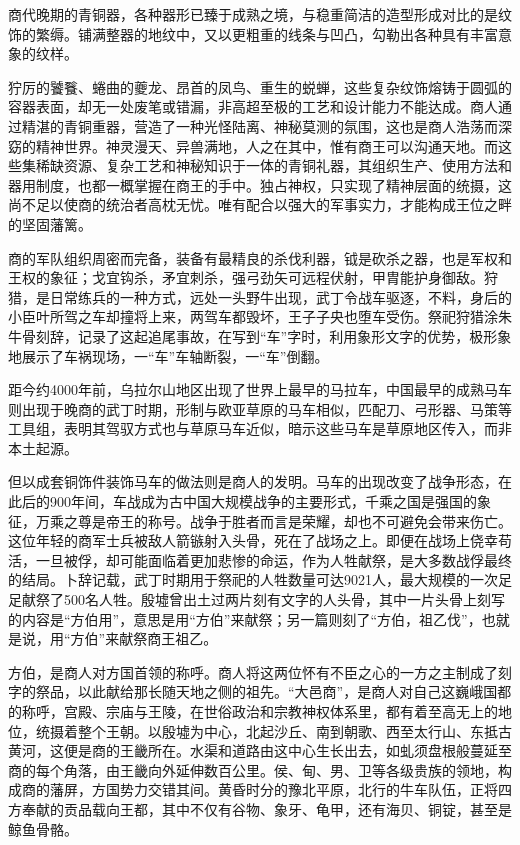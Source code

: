 商代晚期的青铜器，各种器形已臻于成熟之境，与稳重简洁的造型形成对比的是纹饰的繁缛。铺满整器的地纹中，又以更粗重的线条与凹凸，勾勒出各种具有丰富意象的纹样。

狞厉的饕餮、蜷曲的夔龙、昂首的凤鸟、重生的蜕蝉，这些复杂纹饰熔铸于圆弧的容器表面，却无一处废笔或错漏，非高超至极的工艺和设计能力不能达成。商人通过精湛的青铜重器，营造了一种光怪陆离、神秘莫测的氛围，这也是商人浩荡而深窈的精神世界。神灵漫天、异兽满地，人之在其中，惟有商王可以沟通天地。而这些集稀缺资源、复杂工艺和神秘知识于一体的青铜礼器，其组织生产、使用方法和器用制度，也都一概掌握在商王的手中。独占神权，只实现了精神层面的统摄，这尚不足以使商的统治者高枕无忧。唯有配合以强大的军事实力，才能构成王位之畔的坚固藩篱。

商的军队组织周密而完备，装备有最精良的杀伐利器，钺是砍杀之器，也是军权和王权的象征；戈宜钩杀，矛宜刺杀，强弓劲矢可远程伏射，甲胄能护身御敌。狩猎，是日常练兵的一种方式，远处一头野牛出现，武丁令战车驱逐，不料，身后的小臣叶所驾之车却撞将上来，两驾车都毁坏，王子子央也堕车受伤。祭祀狩猎涂朱牛骨刻辞，记录了这起追尾事故，在写到“车”字时，利用象形文字的优势，极形象地展示了车祸现场，一“车”车轴断裂，一“车”倒翻。

距今约4000年前，乌拉尔山地区出现了世界上最早的马拉车，中国最早的成熟马车则出现于晚商的武丁时期，形制与欧亚草原的马车相似，匹配刀、弓形器、马策等工具组，表明其驾驭方式也与草原马车近似，暗示这些马车是草原地区传入，而非本土起源。

但以成套铜饰件装饰马车的做法则是商人的发明。马车的出现改变了战争形态，在此后的900年间，车战成为古中国大规模战争的主要形式，千乘之国是强国的象征，万乘之尊是帝王的称号。战争于胜者而言是荣耀，却也不可避免会带来伤亡。这位年轻的商军士兵被敌人箭镞射入头骨，死在了战场之上。即便在战场上侥幸苟活，一旦被俘，却可能面临着更加悲惨的命运，作为人牲献祭，是大多数战俘最终的结局。卜辞记载，武丁时期用于祭祀的人牲数量可达9021人，最大规模的一次足足献祭了500名人牲。殷墟曾出土过两片刻有文字的人头骨，其中一片头骨上刻写的内容是“方伯用”，意思是用“方伯”来献祭；另一篇则刻了“方伯，祖乙伐”，也就是说，用“方伯”来献祭商王祖乙。

方伯，是商人对方国首领的称呼。商人将这两位怀有不臣之心的一方之主制成了刻字的祭品，以此献给那长随天地之侧的祖先。“大邑商”，是商人对自己这巍峨国都的称呼，宫殿、宗庙与王陵，在世俗政治和宗教神权体系里，都有着至高无上的地位，统摄着整个王朝。以殷墟为中心，北起沙丘、南到朝歌、西至太行山、东抵古黄河，这便是商的王畿所在。水渠和道路由这中心生长出去，如虬须盘根般蔓延至商的每个角落，由王畿向外延伸数百公里。侯、甸、男、卫等各级贵族的领地，构成商的藩屏，方国势力交错其间。黄昏时分的豫北平原，北行的牛车队伍，正将四方奉献的贡品载向王都，其中不仅有谷物、象牙、龟甲，还有海贝、铜锭，甚至是鲸鱼骨骼。

